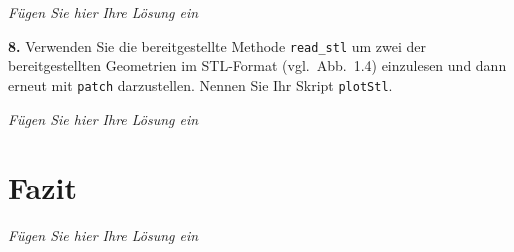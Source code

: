 \documentclass[Protokollheft.tex]{subfiles}
\begin{document}
\emph{Fügen Sie hier Ihre Lösung ein}

      \begin{framed}
	\noindent \textbf{8.} Verwenden Sie die bereitgestellte Methode \lstinline{read_stl} um zwei der bereitgestellten Geometrien im STL-Format (vgl.~Abb.~1.4) einzulesen und dann erneut mit \lstinline{patch} darzustellen.
                Nennen Sie Ihr Skript \lstinline{plotStl}.\label{exer:plotStl}
\end{framed}

\emph{Fügen Sie hier Ihre Lösung ein}


\section{Fazit}
\emph{Fügen Sie hier Ihre Lösung ein}
\end{document}
